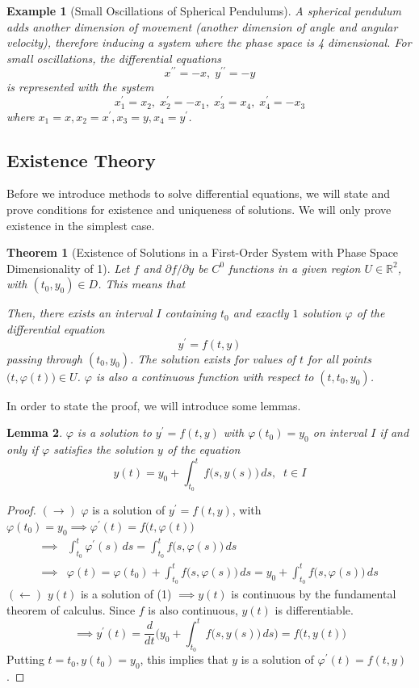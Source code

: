 \documentclass{article}
\newtheorem{theorem}{Theorem}[section]
\newtheorem{lemma}[theorem]{Lemma}
\newtheorem{example}{Example}[section]
\theoremstyle{remark}
\theoremstyle{definition}
\begin{document}
\begin{example}[Small Oscillations of Spherical Pendulums]
A spherical pendulum adds another dimension of movement (another dimension of angle and angular velocity), therefore inducing a system where the phase space is 4 dimensional. For small oscillations, the differential equations
\[x^{\prime\prime} = -x, \; y^{\prime\prime} = - y\]
is represented with the system
\[x_1^\prime = x_2, \; x_2^\prime = -x_1, \; x_3^\prime = x_4, \; x_4^\prime = - x_3\]
where $x_1 = x, x_2 = x^\prime, x_3 = y, x_4 = y^\prime$. 
\end{example}

\subsection{Existence Theory}
Before we introduce methods to solve differential equations, we will state and prove conditions for existence and uniqueness of solutions. We will only prove existence in the simplest case. 
\begin{theorem}[Existence of Solutions in a First-Order System with Phase Space Dimensionality of 1]
Let $f$ and $\partial f / \partial y$ be $C^0$ functions in a given region $U \in \mathbb{R}^2$, with $(t_0, y_0) \in D$. This means that 

Then, there exists an interval $I$ containing $t_0$ and exactly $1$ solution $\varphi$ of the differential equation 
\[y^\prime = f(t, y)\]
passing through $(t_0, y_0)$. The solution exists for values of $t$ for all points $\big(t, \varphi(t)\big) \in U$. $\varphi$ is also a continuous function with respect to $(t, t_0, y_0)$. 
\end{theorem}
In order to state the proof, we will introduce some lemmas. 

\begin{lemma}
$\varphi$ is a solution to $y^\prime = f(t, y)$ with $\varphi(t_0) = y_0$ on interval $I$ if and only if $\varphi$ satisfies the solution $y$ of the equation
\begin{equation}
    y(t) = y_0 + \int_{t_0}^t f\big( s, y(s)\big) \,ds, \;\; t \in I
\end{equation}
\end{lemma}
\begin{proof}
$(\rightarrow)$ $\varphi$ is a solution of $y^\prime = f(t, y)$, with $\varphi(t_0) = y_0 \implies \varphi^\prime (t) = f \big(t, \varphi(t) \big)$
\begin{align*}
    \implies & \int_{t_0}^t \varphi^\prime (s) \,ds = \int_{t_0}^t f \big( s, \varphi(s) \big) \, ds \\
    \implies & \varphi(t) = \varphi(t_0) + \int_{t_0}^t f\big(s, \varphi(s)\big) \,ds = y_0 + \int_{t_0}^t f \big( s, \varphi(s) \big) \,ds
\end{align*}
$(\leftarrow)$ $y(t)$ is a solution of (1) $\implies y(t)$ is continuous by the fundamental theorem of calculus. Since $f$ is also continuous, $y(t)$ is differentiable. 
\[\implies y^\prime (t) = \frac{d}{dt} \bigg( y_0 + \int_{t_0}^t f\big( s, y(s) \big) \, ds \bigg) = f\big(t, y(t) \big)\]
Putting $t=t_0, y (t_0) = y_0$, this implies that $y$ is a solution of $\varphi^\prime (t) = f(t, y)$. 
\end{proof}
\end{document}

